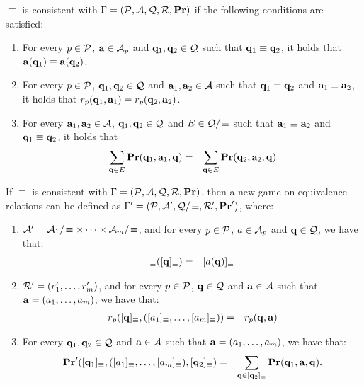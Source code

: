 \begin{mydef}
$\equiv$ is consistent with $\Gamma = (\mathcal{P},\mathcal{A},\mathcal{Q},\mathcal{R},\mathbf{Pr})$ if the following conditions are satisfied:
\begin{enumerate}
\item For every $p \in \mathcal{P}$, $\mathbf{a} \in \mathcal{A}_p$ and $\mathbf{q}_1, \mathbf{q}_2 \in \mathcal{Q}$ such that $\mathbf{q}_1 \equiv \mathbf{q}_2$, it holds that $\mathbf{a}(\mathbf{q}_1) \equiv \mathbf{a}(\mathbf{q}_2)$.

\item For every $p \in \mathcal{P}$, $\mathbf{q}_1, \mathbf{q}_2 \in \mathcal{Q}$ and $\mathbf{a}_1,\mathbf{a}_2 \in \mathcal{A}$ such that $\mathbf{q}_1 \equiv \mathbf{q}_2$ and  $\mathbf{a}_1 \equiv \mathbf{a}_2$, it holds that $r_p(\mathbf{q}_1, \mathbf{a}_1) = r_p(\mathbf{q}_2, \mathbf{a}_2)$.

\item For every $\mathbf{a}_1,\mathbf{a}_2 \in \mathcal{A}$, $\mathbf{q}_1, \mathbf{q}_2 \in \mathcal{Q}$ and $E \in \mathcal{Q}/\!\equiv$ such that $\mathbf{a}_1 \equiv \mathbf{a}_2$ and $\mathbf{q}_1 \equiv \mathbf{q}_2$, it holds that 
\begin{eqnarray*}
\sum_{\mathbf{q} \in E} \mathbf{Pr}(\mathbf{q}_1, \mathbf{a}_1, \mathbf{q}) & = & \sum_{\mathbf{q} \in E} \mathbf{Pr}(\mathbf{q}_2, \mathbf{a}_2, \mathbf{q})
\end{eqnarray*}

\end{enumerate}
\end{mydef}
If $\equiv$ is consistent with $\Gamma = (\mathcal{P},\mathcal{A},\mathcal{Q},\mathcal{R},\mathbf{Pr})$, then a new game on equivalence relations can be defined as $\Gamma' = (\mathcal{P},\mathcal{A}',\mathcal{Q}/\!\equiv,\mathcal{R}',\mathbf{Pr}')$, where:
\begin{enumerate}
\item $\mathcal{A}' = \mathcal{A}_1/\!\equiv \times \cdots \times \mathcal{A}_m/\!\equiv$, and for every $p \in \mathcal{P}$, $a \in \mathcal{A}_p$ and $\mathbf{q} \in \mathcal{Q}$, we have that:
\begin{eqnarray*}
[a]_\equiv([\bq]_\equiv) & = & [a(\bq)]_\equiv
\end{eqnarray*}

\item $\mathcal{R}' = (r'_1, \ldots, r'_m)$, and for every $p \in \mathcal{P}$, $\mathbf{q} \in \mathcal{Q}$ and $\mathbf{a} \in \mathcal{A}$ such that $\mathbf{a} = (a_1, \ldots, a_m)$, we have that:
\begin{eqnarray*}
r_p([\mathbf{q}]_\equiv, ([a_1]_\equiv, \ldots, [a_m]_\equiv)) & = & r_p(\mathbf{q}, \mathbf{a})
\end{eqnarray*}

\item For every $\mathbf{q}_1, \mathbf{q}_2 \in \mathcal{Q}$ and $\mathbf{a} \in  \mathcal{A}$ such that $\mathbf{a} = (a_1, \ldots, a_m)$, we have that:
\begin{eqnarray*}
\mathbf{Pr}'([\mathbf{q}_1]_\equiv, ([a_1]_\equiv, \ldots, [a_m]_\equiv), [\mathbf{q}_2]_\equiv) & = & \sum_{\mathbf{q} \in [\mathbf{q}_2]_\equiv} \mathbf{Pr}(\mathbf{q}_1, \mathbf{a}, \mathbf{q}).
\end{eqnarray*}
\end{enumerate}
